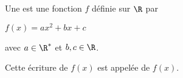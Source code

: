 \begin{Definition}
    Une est une fonction $f$ définie sur $\R$ par 
    \begin{center}$f(x)=a x^2+b x + c$\end{center}
    avec $a\in \R^*$ et $b,c \in \R$.
    
    Cette écriture de $f(x)$ est appelée de $f(x)$.
\end{Definition}